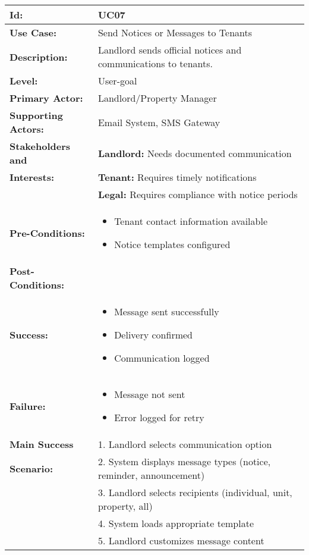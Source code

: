 \documentclass[12pt]{article}
\begin{document}
\begin{longtable}{|p{3cm}|p{11cm}|}
\hline
\textbf{Id:} & UC07 \\
\hline
\textbf{Use Case:} & Send Notices or Messages to Tenants \\
\hline
\textbf{Description:} & Landlord sends official notices and communications to tenants. \\
\hline
\textbf{Level:} & User-goal \\
\hline
\textbf{Primary Actor:} & Landlord/Property Manager \\
\hline
\textbf{Supporting Actors:} & Email System, SMS Gateway \\
\hline
\textbf{Stakeholders and} & \textbf{Landlord:} Needs documented communication \\
\textbf{Interests:} & \textbf{Tenant:} Requires timely notifications \\
& \textbf{Legal:} Requires compliance with notice periods \\
\hline
\textbf{Pre-Conditions:} & 
\begin{itemize}
    \item Tenant contact information available
    \item Notice templates configured
\end{itemize} \\
\hline
\textbf{Post-Conditions:} & \\
\textbf{Success:} & 
\begin{itemize}
    \item Message sent successfully
    \item Delivery confirmed
    \item Communication logged
\end{itemize} \\
\textbf{Failure:} & 
\begin{itemize}
    \item Message not sent
    \item Error logged for retry
\end{itemize} \\
\hline
\textbf{Main Success} & 1. Landlord selects communication option \\
\textbf{Scenario:} & 2. System displays message types (notice, reminder, announcement) \\
& 3. Landlord selects recipients (individual, unit, property, all) \\
& 4. System loads appropriate template \\
& 5. Landlord customizes message content \\

\end{longtable}
\end{document}
